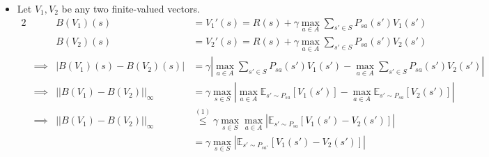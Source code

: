 \begin{solution}
    \begin{itemize}
        \item[(a)]
              Let $V_1, V_2$ be any two finite-valued vectors.
                  {\allowdisplaybreaks
                      \begin{alignat*}{2}
                           &                                                                                    & B(V_1)(s)                  & = V_1'(s) = R(s) + \gamma \max_{a \in A} \sum_{s' \in S} P_{sa}(s') V_1(s')                \\
                           &                                                                                    & B(V_2)(s)                  & = V_2'(s) = R(s) + \gamma \max_{a \in A} \sum_{s' \in S} P_{sa}(s') V_2(s')                \\[2ex]
                           & \implies                                                                           & |B(V_1)(s) - B(V_2)(s)|
                           & = \gamma \left| \max_{a \in A} \sum_{s' \in S} P_{sa}(s') V_1(s')
                          - \max_{a \in A} \sum_{s' \in S} P_{sa}(s') V_2(s') \right|                                                                                                                                                     \\[2ex]
                           & \implies                                                                           & ||B(V_1) - B(V_2)||_\infty
                           & = \gamma \max_{s \in S} \left| \max_{a \in A} \mathbb{E}_{s' \sim P_{sa}}[V_1(s')]
                          - \max_{a \in A} \mathbb{E}_{s' \sim P_{sa}}[V_2(s')] \right|                                                                                                                                                   \\[2ex]
                           & \implies                                                                           & ||B(V_1) - B(V_2)||_\infty
                           & \overset{(1)}{\le} \gamma \max_{s \in S} \max_{a \in A}
                          \left| \mathbb{E}_{s' \sim P_{sa}}[V_1(s') - V_2(s')] \right|                                                                                                                                                   \\
                           &                                                                                    &                            & = \gamma \max_{s \in S} \left| \mathbb{E}_{s' \sim P_{sa^*}}[V_1(s') - V_2(s')] \right|    \\

\end{alignat*}}
\end{itemize}
\end{solution}
